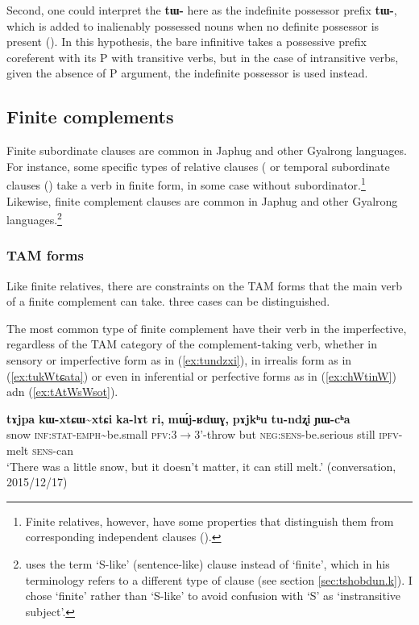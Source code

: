 \documentclass[oneside,a4paper,11pt]{article}
\newcommand{\ipa}[1]{\textbf{\phon#1}} %
\newcommand{\tld}{\textasciitilde{}}
\begin{document}
Second, one could interpret the \ipa{tɯ-} here as the indefinite possessor prefix \ipa{tɯ-}, which is added to inalienably possessed nouns when no definite possessor is present (\citealt{jacques15generic}). In this hypothesis, the bare infinitive takes a possessive prefix coreferent with its P with transitive verbs, but in the case of intransitive verbs, given the absence of P argument, the indefinite possessor is used instead.

 \subsection{Finite complements} 
Finite subordinate clauses are common in Japhug and other Gyalrong languages. For instance, some specific types of relative clauses (\citealt{jackson06guanxiju, jacques16relatives} or temporal subordinate clauses (\citealt{jacques14linking}) take a verb in finite form, in some case without subordinator.\footnote{Finite relatives, however, have some properties that distinguish them from corresponding independent clauses (\citealt[18-21]{jacques16relatives}).} Likewise, finite complement clauses are common in Japhug and other Gyalrong languages.\footnote{\citet[475-7]{sun12complementation} uses the term `S-like' (sentence-like) clause instead of `finite', which in his terminology refers to a different type of clause (see section \ref{sec:tshobdun.k}). I chose `finite' rather than `S-like' to avoid confusion with `S' as  `instransitive subject'. }


\subsubsection{TAM forms} \label{sec:TAM.finite}
Like finite relatives, there are constraints on the TAM forms that the main verb of a finite complement can take. three cases can be distinguished.

The most common type of finite complement have their verb in the imperfective, regardless of the TAM category of the complement-taking verb, whether in sensory or imperfective form as in (\ref{ex:tundzxi}), in irrealis form as in (\ref{ex:tukWtɕata}) or even in inferential or perfective forms as in (\ref{ex:chWtinW}) adn (\ref{ex:tAtWsWsot}).

\begin{exe}
\ex \label{ex:tundzxi}
\gll 
\ipa{tɤjpa} 	\ipa{kɯ-xtɕɯ\tld{}xtɕi} 	\ipa{ka-lɤt} 	\ipa{ri,} 	\ipa{mɯ́j-ʁdɯɣ,} 	\ipa{pɤjkʰu} 	\ipa{tu-ndʐi} 	\ipa{ɲɯ-cʰa} \\
snow \textsc{inf:stat-emph}\tld{}be.small \textsc{pfv}:3$\rightarrow$3'-throw but \textsc{neg:sens}-be.serious still \textsc{ipfv}-melt \textsc{sens}-can \\
\glt `There was a little snow, but it doesn't matter, it can still melt.' (conversation, 2015/12/17)
\end{exe}
\end{document}
